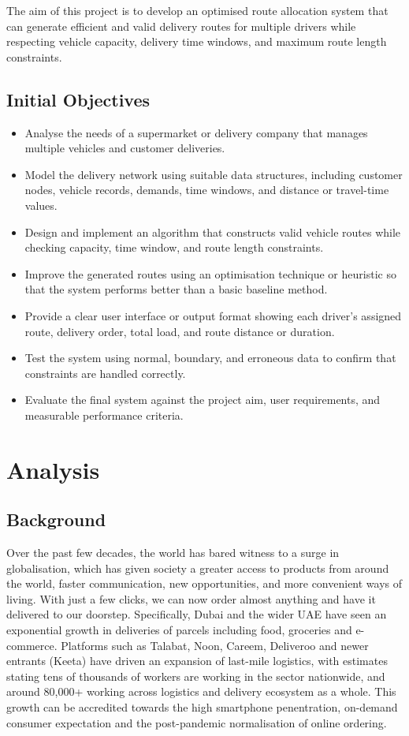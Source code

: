\documentclass[11pt]{article}
\begin{document}
The aim of this project is to develop an optimised route allocation system that can generate efficient and valid delivery routes for multiple drivers while respecting vehicle capacity, delivery time windows, and maximum route length constraints.

\subsection{Initial Objectives}
\label{Specification} %
\begin{itemize}
    \item Analyse the needs of a supermarket or delivery company that manages multiple vehicles and customer deliveries.
    \item Model the delivery network using suitable data structures, including customer nodes, vehicle records, demands, time windows, and distance or travel-time values.
    \item Design and implement an algorithm that constructs valid vehicle routes while checking capacity, time window, and route length constraints.
    \item Improve the generated routes using an optimisation technique or heuristic so that the system performs better than a basic baseline method.
    \item Provide a clear user interface or output format showing each driver's assigned route, delivery order, total load, and route distance or duration.
    \item Test the system using normal, boundary, and erroneous data to confirm that constraints are handled correctly.
    \item Evaluate the final system against the project aim, user requirements, and measurable performance criteria.
\end{itemize}

\newpage
\section{Analysis}

\subsection{Background}
\label{sec:background}
Over the past few decades, the world has bared witness to a surge in globalisation, which has given society a greater access to products from around the world, faster communication, new opportunities, and more convenient ways of living. With just a few clicks, we can now order almost anything and have it delivered to our doorstep. Specifically, Dubai and the wider UAE have seen an exponential growth in deliveries of parcels including food, groceries and e-commerce. Platforms such as Talabat, Noon, Careem, Deliveroo and newer entrants (Keeta) have driven an expansion of last-mile logistics, with estimates stating tens of thousands of workers are working in the sector nationwide, and around 80,000+ working across logistics and delivery ecosystem as a whole. This growth can be accredited towards the high smartphone penentration, on-demand consumer expectation and the post-pandemic normalisation of online ordering.\cite{taxfreesalariesDelivery}
\end{document}
